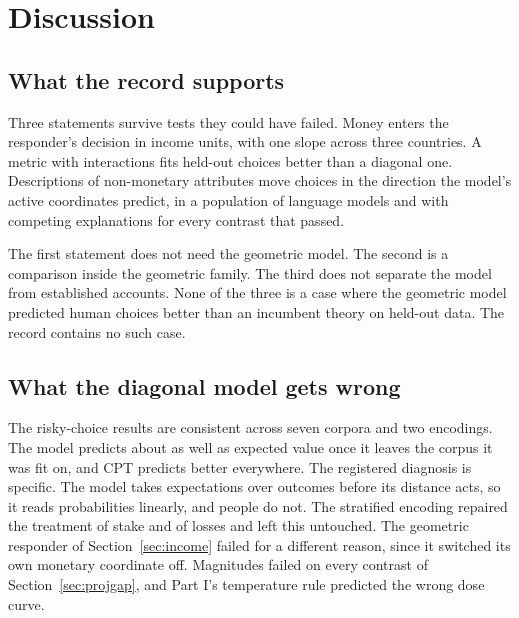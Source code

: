 \documentclass[journal]{IEEEtran}
\begin{document}
\section{Discussion}
\label{sec:discussion}

\subsection{What the record supports}
Three statements survive tests they could have failed.
Money enters the responder's decision in income units, with one slope across three countries.
A metric with interactions fits held-out choices better than a diagonal one.
Descriptions of non-monetary attributes move choices in the direction the model's active coordinates predict, in a population of language models and with competing explanations for every contrast that passed.

The first statement does not need the geometric model.
The second is a comparison inside the geometric family.
The third does not separate the model from established accounts.
None of the three is a case where the geometric model predicted human choices better than an incumbent theory on held-out data.
The record contains no such case.

\subsection{What the diagonal model gets wrong}
The risky-choice results are consistent across seven corpora and two encodings.
The model predicts about as well as expected value once it leaves the corpus it was fit on, and CPT predicts better everywhere.
The registered diagnosis is specific.
The model takes expectations over outcomes before its distance acts, so it reads probabilities linearly, and people do not.
The stratified encoding repaired the treatment of stake and of losses and left this untouched.
The geometric responder of Section~\ref{sec:income} failed for a different reason, since it switched its own monetary coordinate off.
Magnitudes failed on every contrast of Section~\ref{sec:projgap}, and Part I's temperature rule predicted the wrong dose curve.
\end{document}
